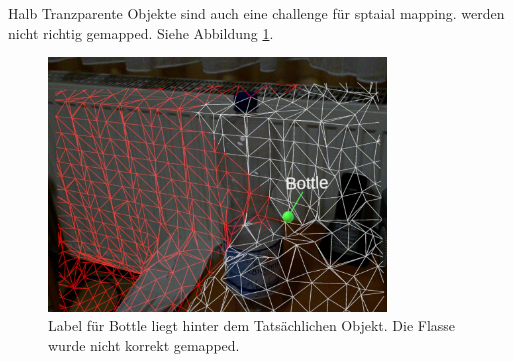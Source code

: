 Halb Tranzparente Objekte sind auch eine challenge für sptaial mapping. werden nicht richtig gemapped. Siehe Abbildung \ref{img:flasche}.

\begin{figure}[H]
	\centering
	\includegraphics[width=0.8\textwidth]{images/ML_20201004_19.12.13.jpg}
	\caption[]{Label für Bottle liegt hinter dem Tatsächlichen Objekt. Die Flasse wurde nicht korrekt gemapped.}
	\label{img:flasche}
\end{figure}
